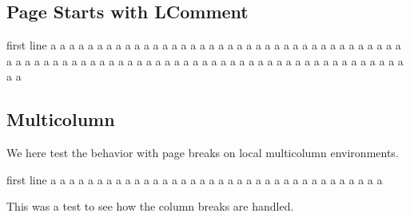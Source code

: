 \documentclass[a4paper]{article}
\begin{document}
	\newpage
	\subsection{Page Starts with LComment}
	\begin{algorithmic}[1]
		\State first line
			\State a
			\State a
			\State a
			\State a
			\State a
			\State a
			\State a
			\State a
			\State a
			\State a
			\State a
			\State a
			\State a
			\State a
			\State a
			\State a
			\State a
			\State a
			\State a
			\State a
			\State a
			\State a
			\State a
			\State a
			\State a
			\State a
			\State a
			\State a
			\State a
			\State a
			\State a
			\State a
			\State a
			\State a
			\State a
			\State a
			\State a
			\State a
			\State a
			\State a
			\State a
			\State a
			\State a
			\State a
			\State a
			\State a
			\State a
			\State a
			\State a
			\State a
			\State a
			\State a
			\State a
			\State a
			\State a
			\State a
			\State a
			\State a
			\State a
			\State a
			\State a
			\State a
			\State a
			\State a
			\State a
			\State a
			\State a
			\State a
			\State a
			\State a
			\State a
				\State a
				\State a
				\State a
				\State a
				\State a
				\State a
				\State a
			\EndIf
			\State a
			\State a
			\State a
			\State a
			\State a
		\EndIf
    \end{algorithmic}

	\newpage
	\subsection{Multicolumn}
	We here test the behavior with page breaks on local multicolumn environments.
	\begin{multicols}{3}
		\begin{algorithmic}[1]
			\State first line
				\State a
				\State a
				\State a
				\State a
				\State a
				\State a
				\State a
				\State a
				\State a
				\State a
					\State a
					\State a
					\State a
					\State a
					\State a
					\State a
					\State a
					\State a
					\State a
					\State a
					\State a
					\State a
					\State a
					\State a
					\State a
					\State a
					\State a
					\State a
					\State a
				\EndIf
				\State a
				\State a
				\State a
				\State a
				\State a
				\State a
				\State a
			\EndIf
		\end{algorithmic}
	\end{multicols}
	This was a test to see how the column breaks are handled.
\end{document}
